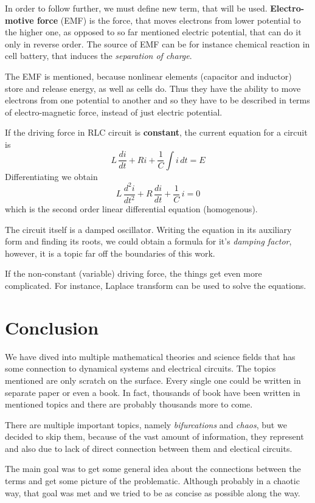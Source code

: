 \documentclass[journal]{IEEEtran}
\begin{document}
In order to follow further, we must define new term, that will be used. \textbf{Electro-motive force} (EMF) is the force, that moves electrons from lower potential to the higher one, as opposed to so far mentioned electric potential, that can do it only in reverse order. The source of EMF can be for instance chemical reaction in cell battery, that induces the \textit{separation of charge}.

The EMF is mentioned, because nonlinear elements (capacitor and inductor) store and release energy, as well as cells do. Thus they have the ability to move electrons from one potential to another and so they have to be described in terms of electro-magnetic force, instead of just electric potential.

If the driving force in RLC circuit is \textbf{constant}, the current equation for a circuit is
$$L\,\frac{di}{dt} + Ri + \frac{1}{C}\int i\,dt = E$$
Differentiating we obtain
$$L\,\frac{d^2i}{dt^2} + R\,\frac{di}{dt} + \frac1C\,i = 0$$
which is the second order linear differential equation (homogenous).

The circuit itself is a damped oscillator. Writing the equation in its auxiliary form and finding its roots, we could obtain a formula for it's \textit{damping factor}, however, it is a topic far off the boundaries of this work.

If the non-constant (variable) driving force, the things get even more complicated. For instance, Laplace transform can be used to solve the equations.

\section{Conclusion}
We have dived into multiple mathematical theories and science fields that has some connection to dynamical systems and electrical circuits. The topics mentioned are only scratch on the surface. Every single one could be written in separate paper or even a book. In fact, thousands of book have been written in mentioned topics and there are probably thousands more to come.

There are multiple important topics, namely \textit{bifurcations} and \textit{chaos}, but we decided to skip them, because of the vast amount of information, they represent and also due to lack of direct connection between them and electical circuits.

The main goal was to get some general idea about the connections between the terms and get some picture of the problematic. Although probably in a chaotic way, that goal was met and we tried to be as concise as possible along the way.
\end{document}
